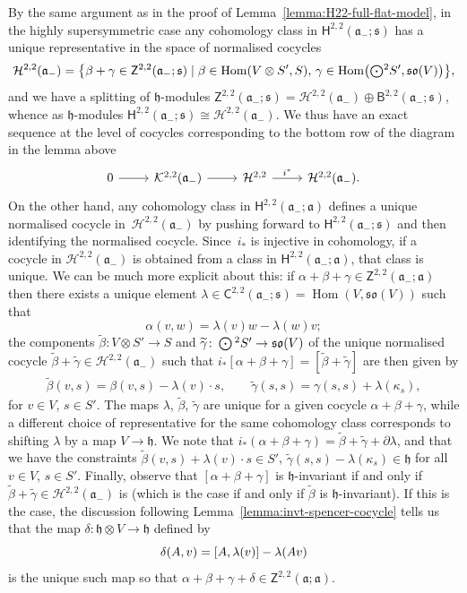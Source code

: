 \documentclass[11pt]{article}
\numberwithin{equation}{section}
\numberwithin{equation}{section}
\newcommand{\fa}{\mathfrak{a}}
\newcommand{\fh}{\mathfrak{h}}
\newcommand{\fs}{\mathfrak{s}}
\newcommand{\fso}{\mathfrak{so}}
\newcommand{\cH}{\mathcal{H}}
\newcommand{\cK}{\mathcal{K}}
\newcommand{\ssB}{\mathsf{B}}
\newcommand{\ssC}{\mathsf{C}}
\newcommand{\ssH}{\mathsf{H}}
\newcommand{\ssZ}{\mathsf{Z}}
\newcommand{\betatilde}{\widetilde{\beta}}
\newcommand{\gammatilde}{\widetilde{\gamma}}
\newcommand{\Odot}{\mathchoice{{\textstyle\bigodot}}{\bigodot}{\bigodot}{\bigodot}}
\newcommand{\1}{\mathbbm{1}}
\DeclareMathOperator{\Hom}{Hom}
\begin{document}
By the same argument as in the proof of Lemma~\ref{lemma:H22-full-flat-model}, in the highly supersymmetric case any cohomology class in $\ssH^{2,2}(\fa_-;\fs)$ has a unique representative in the space of normalised cocycles
\[%
	\cH^{2,2}(\fa_-)
	= \bigl\{\beta+\gamma \in \ssZ^{2,2}(\fa_-;\fs)
		\mid
			\beta\in\Hom(V\otimes S',S),\,
			\gamma\in\Hom\bigl(\Odot^2S',\fso(V)\bigr)\bigr\},
\]
and we have a splitting of $\fh$-modules $\ssZ^{2,2}(\fa_-;\fs)=\cH^{2,2}(\fa_-)\oplus\ssB^{2,2}(\fa_-;\fs)$, whence as $\fh$-modules $\ssH^{2,2}(\fa_-;\fs) \cong \cH^{2,2}(\fa_-)$. We thus have an exact sequence at the level of cocycles corresponding to the bottom row of the diagram in the lemma above
\[
\begin{tikzcd}
	0 \arrow[r]
	& \cK^{2,2}(\fa_-) \arrow[r]
	& \cH^{2,2} \arrow[r, "i^*"]
	& \cH^{2,2}(\fa_-).
\end{tikzcd}
\]
On the other hand, any cohomology class in $\ssH^{2,2}(\fa_-;\fa)$ defines a unique normalised cocycle in~$\cH^{2,2}(\fa_-)$ by pushing forward to $\ssH^{2,2}(\fa_-;\fs)$ and then identifying the normalised cocycle. Since~$i_*$ is injective in cohomology, if a cocycle in $\cH^{2,2}(\fa_-)$ is obtained from a class in $\ssH^{2,2}(\fa_-;\fa)$, that class is unique. We can be much more explicit about this: if $\alpha+\beta+\gamma\in\ssZ^{2,2}(\fa_-;\fa)$ then there exists a unique element $\lambda\in\ssC^{2,2}(\fa_-;\fs)=\Hom(V,\fso(V))$ such that
\begin{equation}\label{eq:alpha-lambda}
	\alpha(v,w) = \lambda(v)w - \lambda(w)v;
\end{equation}
the components $\betatilde\colon V\otimes S' \to S$ and $\gammatilde\colon \Odot^2 S' \to \fso(V)$ of the unique normalised cocycle $\betatilde+\gammatilde\in\cH^{2,2}(\fa_-)$ such that $i_*[\alpha+\beta+\gamma]=[\betatilde+\gammatilde]$ are then given by
\begin{align}%
	\betatilde(v,s) = \beta(v,s) - \lambda(v)\cdot s,\qquad
	\gammatilde(s,s) = \gamma(s,s) + \lambda(\kappa_s), \label{eq:gamma-tilde}
\end{align}
for $v\in V$, $s\in S'$. The maps $\lambda$, $\betatilde$, $\gammatilde$ are unique for a given cocycle $\alpha+\beta+\gamma$, while a different choice of representative for the same cohomology class corresponds to shifting $\lambda$ by a map $V\to\fh$. We note that
$i_*(\alpha+\beta+\gamma) = \betatilde+\gammatilde+\partial\lambda$,
and that we have the constraints
$\betatilde(v,s) + \lambda(v)\cdot s \in S'$, $
	\gammatilde(s,s) - \lambda(\kappa_s) \in \fh$
for all $v\in V$, $s\in S'$. Finally, observe that $[\alpha+\beta+\gamma]$ is $\fh$-invariant if and only if $\betatilde+\gammatilde\in\cH^{2,2}(\fa_-)$ is (which is the case if and only if $\betatilde$ is $\fh$-invariant). If this is the case, the discussion following Lemma~\ref{lemma:invt-spencer-cocycle} tells us that the map $\delta\colon \fh\otimes V\to\fh$ defined by
\begin{equation}\label{eq:delta-lambda}
	\delta(A,v) = \comm{A}{\lambda(v)} - \lambda(Av)
\end{equation}
is the unique such map so that $\alpha+\beta+\gamma+\delta\in\ssZ^{2,2}(\fa;\fa)$.
\end{document}

